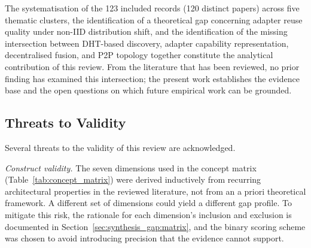 The systematisation of the 123 included records (120 distinct papers) across five thematic clusters, the identification of a theoretical gap concerning adapter reuse quality under non-IID distribution shift, and the identification of the missing
intersection between DHT-based discovery, adapter capability representation,
decentralised fusion, and P2P topology together constitute the analytical
contribution of this review.
From the literature that has been reviewed, no prior finding has examined this intersection; the present work establishes the evidence base and the open
questions on which future empirical work can be grounded.

\subsection{Threats to Validity}
\label{sec:conclusion:threats}

Several threats to the validity of this review are acknowledged.

\textit{Construct validity.}
The seven dimensions used in the concept matrix (Table~\ref{tab:concept_matrix}) were derived inductively from recurring architectural properties in the reviewed literature, not from an a priori theoretical framework. A different set of dimensions could yield a different gap profile. To mitigate this risk, the rationale for each dimension's inclusion and exclusion is documented in Section~\ref{sec:synthesis_gap:matrix}, and the binary scoring scheme was chosen to avoid introducing precision that the evidence cannot support.

